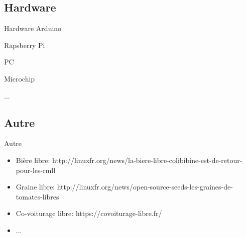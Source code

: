 \documentclass{beamer}
\begin{document}
\subsection{Hardware}
\begin{frame}{Hardware}
\noindent\vspace{0.1in}\hspace{1.2in} Arduino \par 		%
\noindent\vspace{0.1in}\hspace{2.8in} Rapsberry Pi \par	%
\noindent\vspace{0.1in}\hspace{1.5in} PC \par
\noindent\vspace{0.1in}\hspace{0.4in} Microchip \par
\noindent\vspace{0.1in}\hspace{2.2in} ... \par
\end{frame}

\subsection{Autre}
\begin{frame}{Autre} 
\begin{itemize}
	\item Bière libre: http://linuxfr.org/news/la-biere-libre-colibibine-est-de-retour-pour-les-rmll
	\item Graine libre: http://linuxfr.org/news/open-source-seeds-les-graines-de-tomates-libres
	\item Co-voiturage libre: https://covoiturage-libre.fr/
	\item ...
\end{itemize}
\end{frame}



\end{document}

